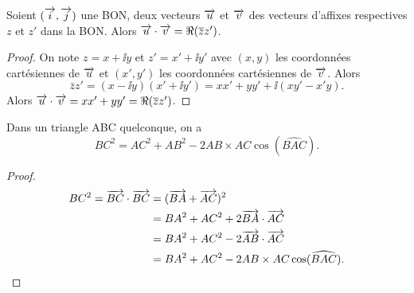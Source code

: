 \begin{prop}
  Soient $(\overrightarrow{i},\overrightarrow{j})$ une BON, deux vecteurs $\overrightarrow{u}$ et $\overrightarrow{v}$ des vecteurs d'affixes respectives $z$ et $z'$ dans la BON\@. Alors $\overrightarrow{u} \cdot \overrightarrow{v}=\Re(\overline{z} z')$.
\end{prop}
\begin{proof}
  On note $z=x+\ii y$ et $z'=x'+\ii y'$ avec $(x,y)$ les coordonnées cartésiennes de $\overrightarrow{u}$ et $(x',y')$ les coordonnées cartésiennes de $\overrightarrow{v}$. Alors
  \begin{equation}
    \bar{z} z' = (x-\ii y)(x'+\ii y')=xx'+yy' + \ii(xy'-x'y).
  \end{equation}
  Alors $\overrightarrow{u} \cdot \overrightarrow{v}=xx' + yy'=\Re(\overline{z} z')$.
\end{proof}
\begin{prop}
  Dans un triangle ABC quelconque, on a 
  \begin{equation}
    BC^2=AC^2+AB^2-2 AB \times AC \cos(\widehat{BAC}).
  \end{equation}
\end{prop}
\begin{proof}
  \begin{align}
    BC^2=\overrightarrow{BC} \cdot \overrightarrow{BC}& =(\overrightarrow{BA}+\overrightarrow{AC})^2 \\
    & = BA^2+AC^2 +2 \overrightarrow{BA} \cdot \overrightarrow{AC} \\ 
    & = BA^2+AC^2 -2 \overrightarrow{AB} \cdot \overrightarrow{AC}\\ 
    & = BA^2+AC^2 -2 AB \times AC \cos(\widehat{BAC}).
  \end{align}
\end{proof}

